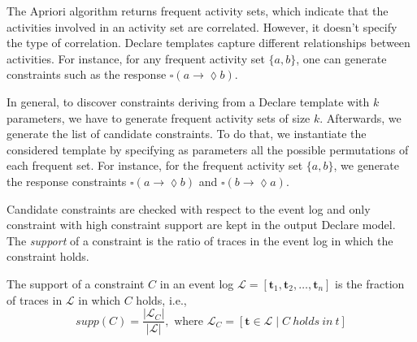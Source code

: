 The Apriori algorithm returns frequent activity sets, which indicate that the activities involved
in an activity set are correlated. However, it doesn't specify the type of correlation.
Declare templates capture different relationships between activities. For instance,
for any frequent activity set $\{ a, b \}$, one can generate constraints such as the response $\square (a \rightarrow \lozenge b)$.


In general, to discover constraints deriving from a Declare template with $k$ parameters,
we have to generate frequent activity sets of size $k$. Afterwards, we generate the list of
candidate constraints. To do that, we instantiate the considered template by specifying
as parameters all the possible permutations of each frequent set. For instance, for the
frequent activity set $\{ a, b \}$, we generate the response constraints
$\square (a \rightarrow \lozenge b)$ and $\square (b \rightarrow \lozenge a)$.

Candidate constraints are checked with respect to the event log and only constraint with high constraint support are kept in the output Declare model. The {\em support} of a constraint is the ratio of traces in the event log in which the constraint holds.
\begin{definition}
The support of a constraint $C$ in an event log $\mathcal{L} = [\textbf{t}_1, \textbf{t}_2, \dots,  \textbf{t}_n]$
is the fraction of traces in $\mathcal{L}$ in which $C$ holds, i.e.,\\
\begin{equation*}
\mathit{supp}(C) = \frac{\vert\mathcal{L}_{C}\vert}{\vert \mathcal{L}\vert}, \text{ where }\mathcal{L}_{C} = [\textbf{t} \in \mathcal{L} \mid C ~holds~in~t]
\end{equation*}
\end{definition}
 

%


